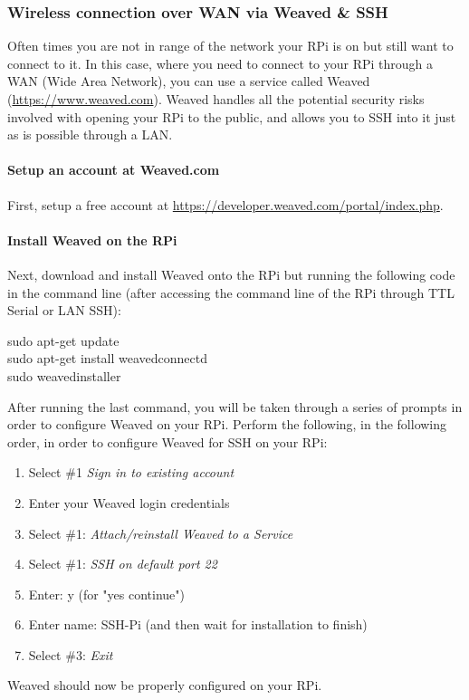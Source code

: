 \documentclass{article}
\newcommand*{\myfont}{\fontfamily{pcr}\selectfont}
\newcommand{\codeb}[2]{
  \begin{tcolorbox}[width=\textwidth,colback={SpringGreen},title={#1},colbacktitle=darkgreen,coltitle=SpringGreen]
    \myfont
    #2
  \end{tcolorbox}
} %
\begin{document}
  \subsubsection{Wireless connection over WAN via Weaved \& SSH}
  \label{sec:connect-sshwan}
    Often times you are not in range of the network your RPi is on but still want to connect to it. In this case, where you need to connect to your RPi through a WAN (Wide Area Network), you can use a service called Weaved (\href{https://www.weaved.com}{https://www.weaved.com}). Weaved handles all the potential security risks involved with opening your RPi to the public, and allows you to SSH into it just as is possible through a LAN.
    \paragraph{Setup an account at Weaved.com}
    First, setup a free account at \href{https://developer.weaved.com/portal/index.php}{https://developer.weaved.com/portal/index.php}.
    \paragraph{Install Weaved on the RPi}
    Next, download and install Weaved onto the RPi but running the following code in the command line (after accessing the command line of the RPi through TTL Serial or LAN SSH):
    \codeb{Download and install Weaved to the RPi}
    {
      sudo apt-get update \\
      sudo apt-get install weavedconnectd \\
      sudo weavedinstaller \\
    }
    After running the last command, you will be taken through a series of prompts in order to configure Weaved on your RPi. Perform the following, in the following order, in order to configure Weaved for SSH on your RPi:
    \begin{enumerate}
      \item Select \#1 \textit{Sign in to existing account}
      \item Enter your Weaved login credentials
      \item Select \#1: \textit{Attach/reinstall Weaved to a Service}
      \item Select \#1: \textit{SSH on default port 22}
      \item Enter: y (for "yes continue")
      \item Enter name: SSH-Pi (and then wait for installation to finish)
      \item Select \#3: \textit{Exit}
    \end{enumerate}
    Weaved should now be properly configured on your RPi.
\end{document}
